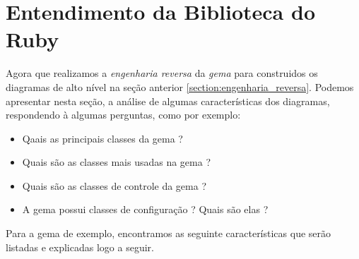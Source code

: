  
\section{Entendimento da Biblioteca do Ruby} 
\label{section:entendimento_da_biblioteca_do_ruby} 

Agora que realizamos a \emph{engenharia reversa} da \emph{gema} para construidos os diagramas
de alto nível na seção anterior \ref{section:engenharia_reversa}. Podemos apresentar
nesta seção, a análise de algumas características dos diagramas, respondendo à algumas perguntas,
como por exemplo:

\begin{itemize}

 \item Qaais as principais classes da gema ?
 
 \item Quais são as classes mais usadas na gema ?
 
 \item Quais são as classes de controle da gema ?
 
 \item A gema possui classes de configuração ? Quais são elas ?
 
\end{itemize}

Para a gema de exemplo, encontramos as seguinte características que serão listadas e explicadas
logo a seguir.

